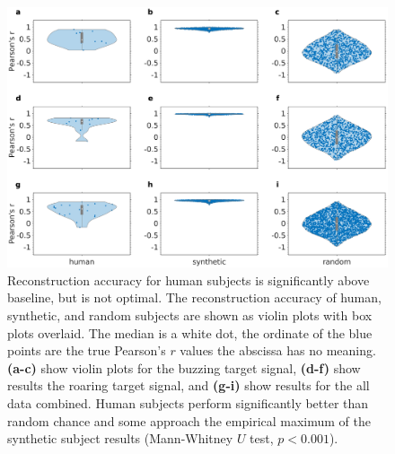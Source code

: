 \documentclass[journal]{IEEEtran}
\begin{document}
\begin{figure}[ht]
    \centering
    \includegraphics[width=\linewidth]{reconstruction_violin_1.eps}
    \caption{Reconstruction accuracy for human subjects
    is significantly above baseline, but is not optimal.
    The reconstruction accuracy of human, synthetic, and random subjects
    are shown as violin plots with box plots overlaid. The median is a white dot,
    the ordinate of the blue points are the true Pearson's $r$ values \textemdash{}
    the abscissa has no meaning.
    \textbf{(a-c)} show violin plots for the buzzing target signal, 
    \textbf{(d-f)} show results the roaring target signal,
    and \textbf{(g-i)} show results for the all data combined.
    Human subjects perform significantly better than random chance
    and some approach the empirical maximum of the synthetic subject results
    (Mann-Whitney $U$ test, $p < 0.001$).}
    \label{fig:reconstructions}
\end{figure}
\end{document}
